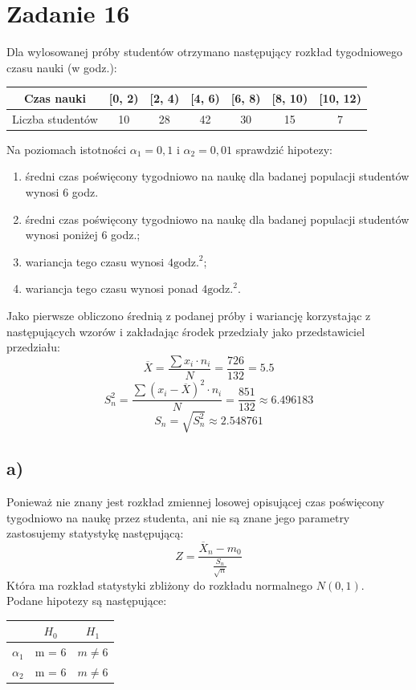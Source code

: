 \documentclass{article}
\begin{document}
\newpage
\section{Zadanie 16}
Dla wylosowanej próby studentów otrzymano następujący rozkład tygodniowego czasu nauki (w godz.):
\begin{center} \begin{tabular}{|c|c|c|c|c|c|c|}
\hline
Czas nauki & [0, 2) & [2, 4) & [4, 6) & [6, 8) & [8, 10) & [10, 12) \\ \hline
Liczba studentów & 10 & 28 & 42 & 30 & 15 & 7 \\ \hline
\end{tabular} \end{center}
Na poziomach istotności $\alpha_1=0,1$ i $\alpha_2=0,01$ sprawdzić hipotezy:
\begin{enumerate}[label = \alph*)]
\item średni czas poświęcony tygodniowo na naukę dla badanej populacji studentów wynosi 6 godz.
\item średni czas poświęcony tygodniowo na naukę dla badanej populacji studentów wynosi poniżej 6 godz.;
\item wariancja tego czasu wynosi $4 \text{godz.}^2$;
\item wariancja tego czasu wynosi ponad $4 \text{godz.}^2$.
\end{enumerate}

Jako pierwsze obliczono średnią z podanej próby i wariancję korzystając z następujących wzorów i zakładając środek przedziały jako przedstawiciel przedziału:
\[ \overline{X}  = \frac{\sum x_i \cdot n_i}{N} = \frac{726}{132} = 5.5 \]
\[ S_n^2 = \frac{\sum (x_i - \overline{X})^2 \cdot n_i}{N} = \frac{851}{132} \approx 6.496183 \]
\[ S_n = \sqrt{S_n^2} \approx 2.548761 \]

\subsection{a)}
Ponieważ nie znany jest rozkład zmiennej losowej opisującej czas poświęcony tygodniowo na naukę przez studenta, ani nie są znane jego parametry zastosujemy statystykę następującą:
\[ Z = \frac{\overline{X}_n - m_0}{\frac{S_n}{\sqrt{n}}} \]
Która ma rozkład statystyki zbliżony do rozkładu normalnego $N(0,1)$. \\
Podane hipotezy są następujące:
\begin{center} \begin{tabular}{|c|c|c|} \hline
 & $H_0$ & $H_1$ \\ \hline
$\alpha_1$ & m = 6 & $m \neq 6$ \\ \hline
$\alpha_2$ & m = 6 & $m \neq 6$ \\ \hline
\end{tabular} \end{center}
\end{document}
